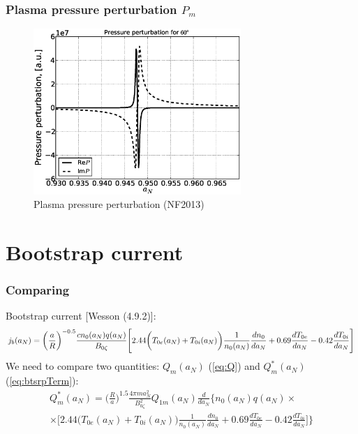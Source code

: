 \documentclass[11pt,oneside,a4paper,notitlepage]{article}
\begin{document}
\section{Plasma pressure perturbation $P_m$}
\begin{figure}[h]
 \centering
 \includegraphics[width=0.7\textwidth]{evans60/perturbation_60.eps}
 \caption{Plasma pressure perturbation (NF2013)}
 \label{fig:pert60}
\end{figure}

\newpage
\part{Bootstrap current}
\section{Comparing}
Bootstrap current [Wesson (4.9.2)]:
\begin{equation}\label{eq:btstrpWesson}
 j_b(a_N)=\bigg(\frac{a}{R}\bigg)^{-0.5}\frac{cn_0(a_N)q(a_N)}{B_{0\zeta}}\Bigg[ \\
 2.44\bigg(T_{0e}(a_N)+T_{0i}(a_N)\bigg)\frac{1}{n_0(a_N)}\frac{dn_0}{da_N}+ \\
 0.69\frac{dT_{0e}}{da_N}-0.42\frac{dT_{0i}}{da_N}\Bigg]
\end{equation}
\newline
We need to compare two quantities: $Q_m(a_N)$ (\ref{eq:Q}) and $Q_m^*(a_N)$ (\ref{eq:btsrpTerm}):
\begin{equation}
 \label{eq:btsrpTerm}
 \begin{split}
 Q_m^*(a_N)=\bigg(\frac{R}{a}\bigg)^{1.5}\frac{4\pi ma_N^2}{B_{0\zeta}^2}Q_{1m}(a_N) \frac{d}{da_N}\Bigg\{ n_0(a_N)q(a_N)\times \\
 \times\bigg[ 2.44\bigg(T_{0e}(a_N)+T_{0i}(a_N)\bigg)\frac{1}{n_0(a_N)}\frac{dn_0}{da_N} + 0.69\frac{dT_{0e}}{da_N}-0.42\frac{dT_{0i}}{da_N} \bigg]  \Bigg\}
\end{split}
\end{equation}
\end{document}

